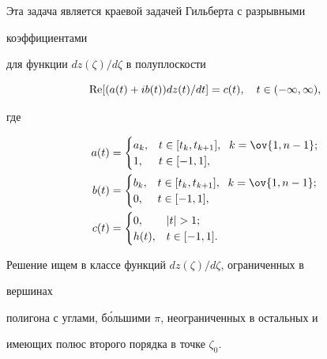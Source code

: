 Эта задача является краевой задачей Гильберта с разрывными 


коэффициентами 


для функции $dz(\zeta)/d\zeta$ в полуплоскости 


$$ 


\re[(a(t)+i b(t))dz(t)/dt]=c(t),\quad t\in(-\infty,\infty), 


$$ 


где 


\begin{align*} 


a(t)&= 


\begin{cases} 


a_k, & t\in[t_k,t_{k+1}],\ \; k=\ov{1,n-1};\\ 


1, & t\in[-1,1], 


\end{cases} 


\\ 


b(t)&= 


\begin{cases} 


b_k, & t\in[t_k,t_{k+1}],\ \; k=\ov{1,n-1};\\ 


0, & t\in[-1,1], 


\end{cases} 


\\ 


c(t)&= 


\begin{cases} 


0, & |t|>1;\\ 


h(t), & t\in[-1,1]. 


\end{cases} 


\end{align*} 


 


Решение ищем в классе функций $dz(\zeta)/d\zeta$, ограниченных в 


вершинах 


полигона с углами, б\'ольшими $\pi$, неограниченных в остальных и 


имеющих полюс второго порядка в точке $\zeta_0$. 


